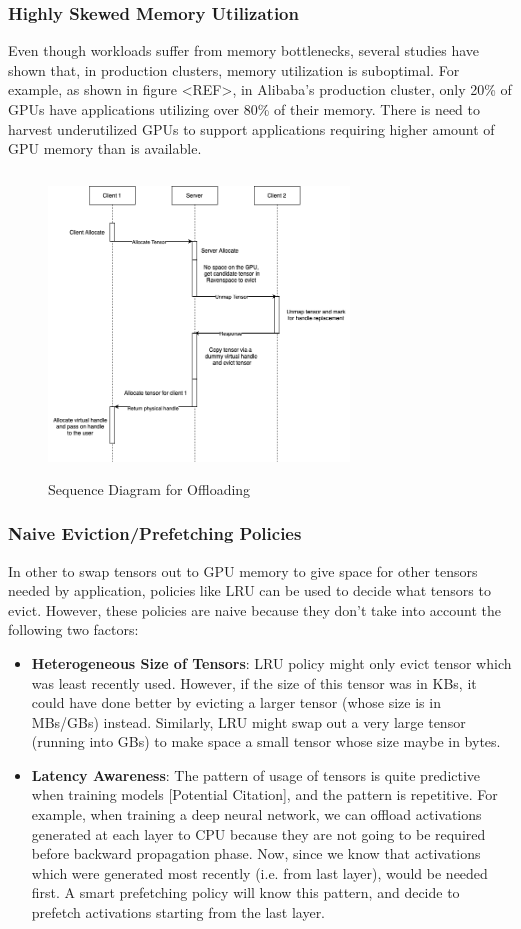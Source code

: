 \documentclass{article}
\begin{document}
	\subsubsection{Highly Skewed Memory Utilization}
	Even though workloads suffer from memory bottlenecks, several studies have shown that, in production clusters, memory utilization
	is suboptimal. For example, as shown in figure <REF>, in Alibaba's production cluster, only 20\% of GPUs have applications
	utilizing over 80\% of their memory. There is need to harvest underutilized GPUs to support applications requiring 
	higher amount of GPU memory than is available.
	\begin{figure}[!htbp]
		\centering
		\includegraphics[height=8cm, width=8cm]{figures/Offloading.drawio.png}
		\caption{Sequence Diagram for Offloading}
	\end{figure}
	\FloatBarrier

	\subsubsection{Naive Eviction/Prefetching Policies} In other to swap tensors out to GPU memory to give space for other tensors needed by application,
	policies like LRU can be used to decide what tensors to evict. However, these policies are naive because they don't take into account the following two factors:
	\begin{itemize}
		\item \textbf{Heterogeneous Size of Tensors}: LRU policy might only evict tensor which was least recently used. However, 
		if the size of this tensor was in KBs, it could have done better by evicting a larger tensor (whose size is in MBs/GBs) instead. Similarly,
		LRU might swap out a very large tensor (running into GBs) to make space a small tensor whose size maybe in bytes.
		\item \textbf{Latency Awareness}: The pattern of usage of tensors is quite predictive when training models [Potential Citation], and the pattern is repetitive. For example,
		when training a deep neural network, we can offload activations generated at each layer to CPU because they are not going to be required before backward propagation phase.
		Now, since we know that activations which were generated most recently (i.e. from last layer), would be needed first.
		A smart prefetching policy will know this pattern, and decide to prefetch activations starting from the last layer.
	\end{itemize}
\end{document}
